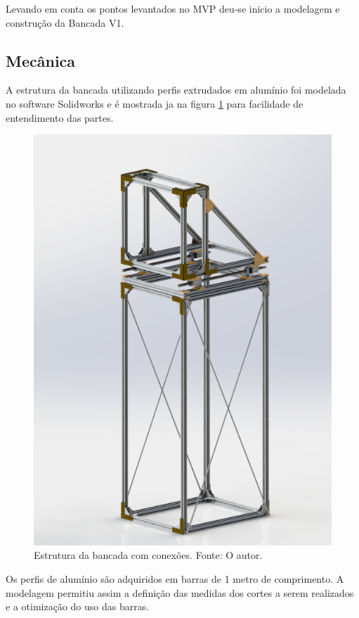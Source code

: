 Levando em conta os pontos levantados no MVP deu-se inicio a modelagem e construção da Bancada V1.



\subsection{Mecânica}

A estrutura da bancada utilizando perfis extrudados em alumínio foi modelada no software Solidworks e é mostrada ja na figura \ref{fig:estrutura_bancada} para facilidade de entendimento das partes.

\begin{figure}[!ht]
    \centering
    \includegraphics[width=.7\linewidth]{figuras/renders/estrutura_bancada_completa.png}
    \caption{Estrutura da bancada com conexões. Fonte: O autor.}
    \label{fig:estrutura_bancada}
\end{figure}

Os perfis de alumínio são adquiridos em barras de 1 metro de comprimento. A modelagem permitiu assim a definição das medidas dos cortes a serem realizados e a otimização do uso das barras.

